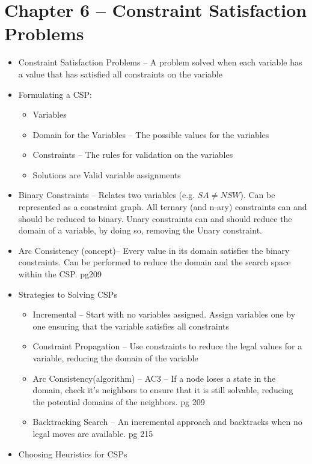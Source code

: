 \documentclass{article}
\begin{document}
\section*{Chapter 6 -- Constraint Satisfaction Problems}
\begin{itemize}
	\item Constraint Satisfaction Problems -- A problem solved when each variable has a value that has satisfied all constraints on the variable
	\item Formulating a CSP:
	\begin{itemize}
		\item Variables
		\item Domain for the Variables -- The possible values for the variables
		\item Constraints -- The rules for validation on the variables
		\item Solutions are Valid variable assignments
	\end{itemize}
	\item Binary Constraints -- Relates two variables (e.g. $SA \ne NSW$). Can be represented as a constraint graph. All ternary (and n-ary) constraints can and should be reduced to binary. Unary constraints can and should reduce the domain of a variable, by doing so, removing the Unary constraint.
	\item Arc Consistency (concept)-- Every value in its domain satisfies the binary constraints. Can be performed to reduce the domain and the search space within the CSP. pg209
	\item Strategies to Solving CSPs
	\begin{itemize}
		\item Incremental -- Start with no variables assigned. Assign variables one by one ensuring that the variable satisfies all constraints
		\item Constraint Propagation -- Use constraints to reduce the legal values for a variable, reducing the domain of the variable
		\item Arc Consistency(algorithm) -- AC3 -- If a node loses a state in the domain, check it's neighbors to ensure that it is still solvable, reducing the potential domains of the neighbors. pg 209
		\item Backtracking Search -- An incremental approach and backtracks when no legal moves are available. pg 215
	\end{itemize}
	\item Choosing Heuristics for CSPs
	\begin{itemize}

\end{itemize}
\end{itemize}
\end{document}
